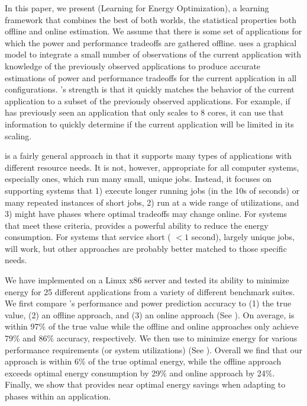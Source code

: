 In this paper, we present \SYSTEMLEO{} (Learning for Energy
Optimization), a learning framework that combines the best of both
worlds, \ie the statistical properties both offline and online
estimation.  We assume that there is some set of applications for
which the power and performance tradeoffs are gathered offline.
\SYSTEMLEO{} uses a graphical model to integrate a small number of
observations of the current application with knowledge of the
previously observed applications to produce accurate estimations of
power and performance tradeoffs for the current application in all
configurations.  \SYSTEMLEO{}'s strength is that it quickly matches the
behavior of the current application to a subset of the previously
observed applications.  For example, if \SYSTEMLEO{} has previously seen
an application that only scales to 8 cores, it can use that
information to quickly determine if the current application will be
limited in its scaling.


\SYSTEMLEO{} is a fairly general approach in that it supports many types
of applications with different resource needs.  It is not, however,
appropriate for all computer systems, especially ones, which run many
small, unique jobs.  Instead, it focuses on supporting systems that 1)
execute longer running jobs (in the 10s of seconds) or many repeated
instances of short jobs, 2) run at a wide range of utilizations, and
3) might have phases where optimal tradeoffs may change online.  For
systems that meet these criteria, \SYSTEMLEO{} provides a powerful
ability to reduce the energy consumption.  For systems that service
short ( $< 1$ second), largely unique jobs, \SYSTEMLEO{} will work, but
other approaches are probably better matched to those specific needs.

We have implemented \SYSTEMLEO{} on a Linux x86 server and tested its
ability to minimize energy for 25 different applications from a
variety of different benchmark suites.  We first compare \SYSTEMLEO{}'s
performance and power prediction accuracy to (1) the true value, (2)
an offline approach, and (3) an online approach (See
).  On average, \SYSTEMLEO{} is within 97\% of the true
value while the offline and online approaches only achieve 79\% and
86\% accuracy, respectively.  We then use \SYSTEMLEO{} to minimize energy
for various performance requirements (or system utilizations) (See
).  Overall we find that our approach is
within 6\% of the true optimal energy, while the offline approach
exceeds optimal energy consumption by 29\% and online approach by
24\%.  Finally, we show that \SYSTEMLEO{} provides near optimal energy
savings when adapting to phases within an application.

